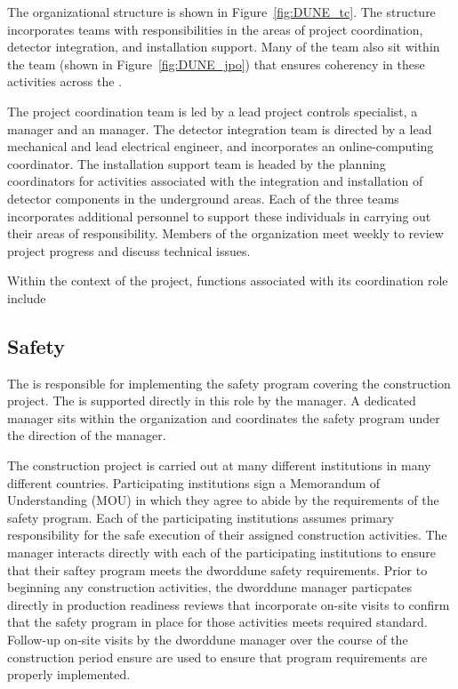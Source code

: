 The   organizational structure is shown in 
Figure~\ref{fig:DUNE_tc}.  The structure incorporates teams with 
responsibilities in the areas of project coordination, detector integration,
and installation support.  Many of the  team also sit within 
the  team (shown in Figure~\ref{fig:DUNE_jpo}) that ensures 
coherency in these activities across the . 

The project coordination team is led by a lead project controls
specialist, a  manager and an  manager.  The
detector integration team is directed by a lead mechanical and lead
electrical engineer, and incorporates an online-computing coordinator.
The installation support team is headed by the planning coordinators 
for activities associated with the integration and installation of 
detector components in the underground areas.  Each of the three 
teams incorporates additional personnel to support these individuals 
in carrying out their areas of responsibility.  Members of the 
 organization meet weekly to review project progress and 
discuss %
technical issues. 
     
Within the context of the  project,  functions 
associated with its coordination role include

\subsection{Safety}

The  is responsible for implementing the safety program
covering the  construction project.  The 
is supported directly in this role by the  
manager.  A dedicated   manager sits within
the  organization and coordinates the  safety
program under the direction of the   manager.

The  construction project is carried out at many different
institutions in many different countries.  Participating institutions
sign a Memorandum of Understanding (MOU) in which they agree to abide
by the requirements of the  safety program.  Each of the
participating institutions assumes primary responsibility for the safe
execution of their assigned construction activities.  The 
 manager interacts directly with each of the participating
institutions to ensure that their saftey program meets the dword{dune}
safety requirements.  Prior to beginning any construction activities,
the dword{dune}  manager particpates directly in production
readiness reviews that incorporate on-site visits to confirm that the
safety program in place for those activities meets required standard.
Follow-up on-site visits by the dword{dune}  manager over
the course of the construction period ensure are used to ensure that
program requirements are properly implemented.


